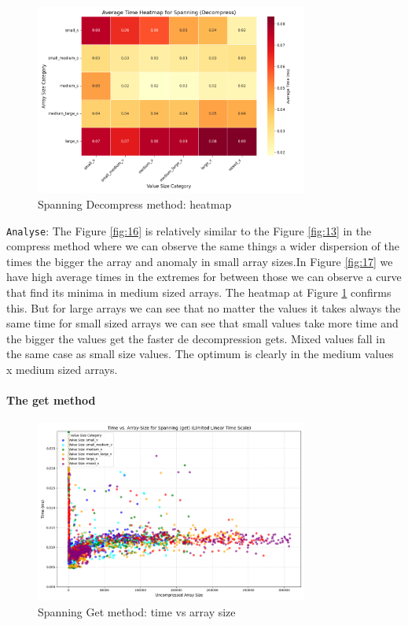 \documentclass[11pt, a4paper]{article}
\begin{document}
	\begin{figure}[H]%
		\centering
		\includegraphics[width=0.8\textwidth]{Grafics/Spanning/SpanningDecompressHeat.png}
		\caption{Spanning Decompress method: heatmap}
		\label{fig:18}
	\end{figure}
	\texttt{Analyse}: The Figure \ref{fig:16} is relatively similar to the Figure \ref{fig:13} in the compress method where we can observe the same things a wider dispersion of the times the bigger the array and anomaly in small array sizes.In Figure \ref{fig:17} we have high average times in the extremes for between those we can observe a curve that find its minima in medium sized arrays. The heatmap at Figure \ref{fig:18} confirms this. But for large arrays we can see that no matter the values it takes always the same time for small sized arrays we can see that small values take more time and the bigger the values get the faster de decompression gets. Mixed values fall in the same case as small size values. The optimum is clearly in the medium values x medium sized arrays.
	
	\paragraph{The get method}
	\begin{figure}[H]%
		\centering
		\includegraphics[width=0.8\textwidth]{Grafics/Spanning/SpanningGetTimevsSize.png}
		\caption{Spanning Get method: time vs array size}
		\label{fig:19}
		
	\end{figure}
	
\end{document}
